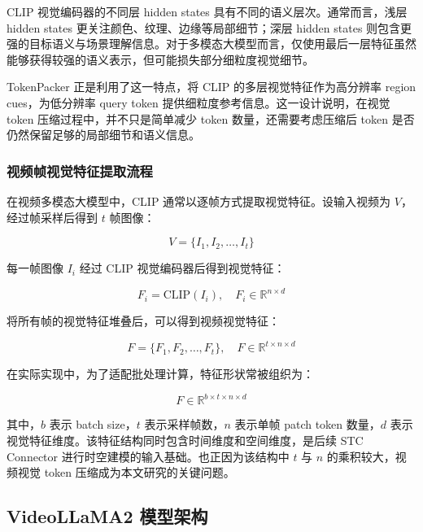 CLIP 视觉编码器的不同层 hidden states 具有不同的语义层次。通常而言，浅层 hidden states 更关注颜色、纹理、边缘等局部细节；深层 hidden states 则包含更强的目标语义与场景理解信息。对于多模态大模型而言，仅使用最后一层特征虽然能够获得较强的语义表示，但可能损失部分细粒度视觉细节。

TokenPacker 正是利用了这一特点，将 CLIP 的多层视觉特征作为高分辨率 region cues，为低分辨率 query token 提供细粒度参考信息\cite{tokenpacker2024}。这一设计说明，在视觉 token 压缩过程中，并不只是简单减少 token 数量，还需要考虑压缩后 token 是否仍然保留足够的局部细节和语义信息。

\subsubsection{视频帧视觉特征提取流程}

在视频多模态大模型中，CLIP 通常以逐帧方式提取视觉特征。设输入视频为 $V$，经过帧采样后得到 $t$ 帧图像：

\begin{equation}
    \label{equ:sampled_frames}
    V=\{I_1,I_2,\dots,I_t\}
\end{equation}

每一帧图像 $I_i$ 经过 CLIP 视觉编码器后得到视觉特征：

\begin{equation}
    \label{equ:clip_frame_feature}
    F_i=\mathrm{CLIP}(I_i), \quad F_i\in\mathbb{R}^{n\times d}
\end{equation}

将所有帧的视觉特征堆叠后，可以得到视频视觉特征：

\begin{equation}
    \label{equ:clip_video_feature}
    F=\{F_1,F_2,\dots,F_t\}, \quad F\in\mathbb{R}^{t\times n\times d}
\end{equation}

在实际实现中，为了适配批处理计算，特征形状常被组织为：

\begin{equation}
    \label{equ:clip_video_feature_batch}
    F\in\mathbb{R}^{b\times t\times n\times d}
\end{equation}

其中，$b$ 表示 batch size，$t$ 表示采样帧数，$n$ 表示单帧 patch token 数量，$d$ 表示视觉特征维度。该特征结构同时包含时间维度和空间维度，是后续 STC Connector 进行时空建模的输入基础。也正因为该结构中 $t$ 与 $n$ 的乘积较大，视频视觉 token 压缩成为本文研究的关键问题。

\subsection{VideoLLaMA2 模型架构}


